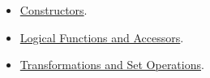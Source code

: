 \documentclass[12pt]{article}
\begin{document}
\begin{itemize}
\item
\underline{Constructors}.
\item
\underline{Logical Functions and Accessors}.
\item
\underline{Transformations and Set Operations}.
\end{itemize}
%
%
%
%
%
%
\end{document}
